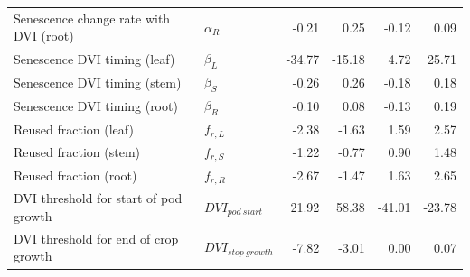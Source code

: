 \begin{tabular}{llrrrr}
  Senescence change rate with DVI (root) & $\alpha_{R}$ & -0.21 & 0.25 & -0.12 & 0.09 \\
  Senescence DVI timing (leaf) & $\beta_{L}$ & -34.77 & -15.18 & 4.72 & 25.71 \\
  Senescence DVI timing (stem) & $\beta_{S}$ & -0.26 & 0.26 & -0.18 & 0.18 \\
  Senescence DVI timing (root) & $\beta_{R}$ & -0.10 & 0.08 & -0.13 & 0.19 \\
  Reused fraction (leaf) & $f_{r,L}$ & -2.38 & -1.63 & 1.59 & 2.57 \\
  Reused fraction (stem) & $f_{r,S}$ & -1.22 & -0.77 & 0.90 & 1.48 \\
  Reused fraction (root) & $f_{r,R}$ & -2.67 & -1.47 & 1.63 & 2.65 \\
  DVI threshold for start of pod growth & $DVI_{pod~start}$ & 21.92 & 58.38 & -41.01 & -23.78 \\
  DVI threshold for end of crop growth & $DVI_{stop~growth}$ & -7.82 & -3.01 & 0.00 & 0.07 \\
  \bottomrule
\end{tabular}
